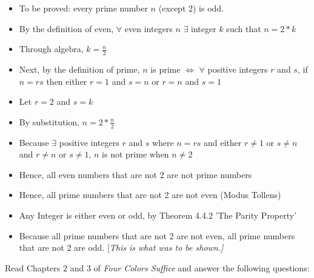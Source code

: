 \documentclass{article}
\begin{document}
\begin{itemize}
\item To be proved: every prime number $n$ (except 2) is odd.
\item By the definition of even, $\forall$ even integers $n$ $\exists$ integer $k$ such that $n = 2 * k$
\item Through algebra, $k = \frac{n}{2}$
\item Next, by the definition of prime, $n$ is prime $\Leftrightarrow$  $\forall$ positive integers $r$ and $s$, if $n = rs$ then either $r=1$ and $s=n$ or $r=n$ and $s=1$
\item Let $r=2$ and $s=k$ 
\item By substitution, $n = 2 * \frac{n}{2}$
\item Because $\exists$ positive integers $r$ and $s$ where $n = rs$ and either $r \neq 1$ or $s \neq n$ and $r \neq n$ or $s \neq 1$, $n$ is not prime when $n \neq 2$
\item Hence, all even numbers that are not 2 are not prime numbers
\item Hence, all prime numbers that are not 2 are not even (Modus Tollens)
\item Any Integer is either even or odd, by Theorem 4.4.2 'The Parity Property'
\item Because all prime numbers that are not 2 are not even, all prime numbers that are not 2 are odd. [\it{This is what was to be shown.}]
\end{itemize}
%
\collab{\todo{}}
Read Chapters $2$ and $3$ of \emph{Four Colors Suffice} and answer the following questions:
\end{document}

